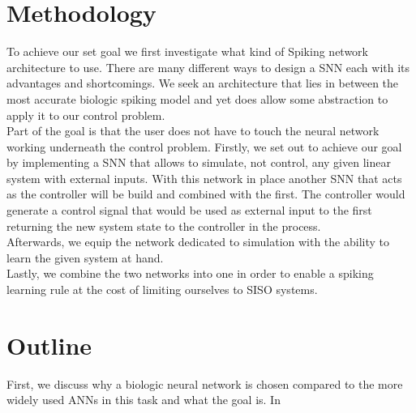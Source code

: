 \section{Methodology}
To achieve our set goal we first investigate what kind of Spiking network architecture to use. There are many different ways to design a \ac{SNN} each with its advantages and shortcomings.
We seek an architecture that lies in between the most accurate biologic spiking model and yet does allow some abstraction to apply it to our control problem.\\
Part of the goal is that the user does not have to touch the neural network working underneath the control problem.
Firstly, we set out to achieve our goal by implementing a \ac{SNN} that allows to simulate, not control, any given linear system with external inputs. With this network in place another \ac{SNN} that acts as the controller will be build and combined with the first. The controller would generate a control signal that would be used as external input to the first returning the new system state to the controller in the process.\\
Afterwards, we equip the network dedicated to simulation with the ability to learn the given system at hand.\\
Lastly, we combine the two networks into one in order to enable a spiking learning rule at the cost of limiting ourselves to \ac{SISO} systems.\\

\section{Outline}

First, we discuss why a biologic neural network is chosen compared to the more widely used \acp{ANN} in this task and what the goal is. In